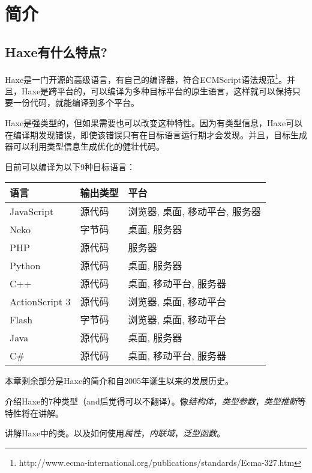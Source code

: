 \chapter{简介}
\label{introduction}

\section{Haxe有什么特点?}
\label{introduction-what-is-haxe}

Haxe是一门开源的高级语言，有自己的编译器，符合ECMScript语法规范\footnote{http://www.ecma-international.org/publications/standards/Ecma-327.htm}。并且，Haxe是跨平台的，可以编译为多种目标平台的原生语言，这样就可以保持只要一份代码，就能编译到多个平台。

Haxe是强类型的，但如果需要也可以改变这种特性。因为有类型信息，Haxe可以在编译期发现错误，即使该错误只有在目标语言运行期才会发现。并且，目标生成器可以利用类型信息生成优化的健壮代码。

目前可以编译为以下9种目标语言：

\begin{center}
\begin{tabular}{| l | l | l |}
	\hline
	语言 & 输出类型 & 平台 \\ \hline
	JavaScript & 源代码 & 浏览器, 桌面, 移动平台, 服务器 \\
	Neko & 字节码 & 桌面, 服务器 \\
	PHP & 源代码 & 服务器 \\
	Python & 源代码 & 桌面, 服务器 \\
	C++ & 源代码 & 桌面, 移动平台, 服务器 \\
	ActionScript 3 & 源代码 & 浏览器, 桌面, 移动平台 \\
	Flash & 字节码 & 浏览器, 桌面, 移动平台 \\ 
	Java & 源代码 & 桌面, 服务器 \\
	C\# & 源代码 & 桌面, 移动平台, 服务器 \\ \hline
\end{tabular}
\end{center}

本章剩余部分是Haxe的简介和自2005年诞生以来的发展历史。

 介绍Haxe的7种类型（and后觉得可以不翻译）。像\emph{结构体}，\emph{类型参数}，\emph{类型推断}等特性将在讲解。

讲解Haxe中的类。以及如何使用\emph{属性}，\emph{内联域}，\emph{泛型函数}。

